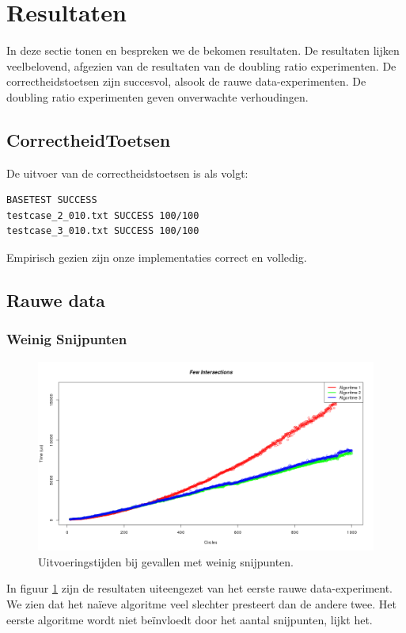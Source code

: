 \newpage
\section{Resultaten}
In deze sectie tonen en bespreken we de bekomen resultaten. De resultaten lijken veelbelovend, afgezien van de resultaten van de doubling ratio experimenten. De correctheidstoetsen zijn succesvol, alsook de rauwe data-experimenten. De doubling ratio experimenten geven onverwachte verhoudingen.

\subsection{CorrectheidToetsen}
De uitvoer van de correctheidstoetsen is als volgt:
\begin{lstlisting}
BASETEST SUCCESS
testcase_2_010.txt SUCCESS 100/100
testcase_3_010.txt SUCCESS 100/100
\end{lstlisting}
Empirisch gezien zijn onze implementaties correct en volledig.

\subsection{Rauwe data}
\subsubsection{Weinig Snijpunten}
\begin{figure}[H]
   	\centering
   	\includegraphics[width=\textwidth]{illustraties/fewIntersections.png}
  	\caption{Uitvoeringstijden bij gevallen met weinig snijpunten.}
  	\label{fig:few_intersections}
\end{figure}
In figuur \ref{fig:few_intersections} zijn de resultaten uiteengezet van het eerste rauwe data-experiment. We zien dat het na\"ieve algoritme veel slechter presteert dan de andere twee. Het eerste algoritme wordt niet be\"invloedt door het aantal snijpunten, lijkt het.

